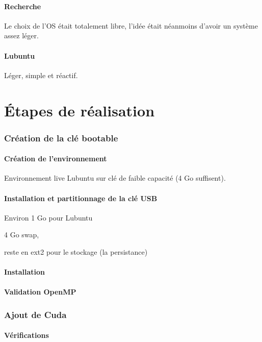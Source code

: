 \documentclass[final]{polytech/polytech}
\begin{document}
\subsection{Recherche}
Le choix de l’OS était totalement libre, l’idée était néanmoins d’avoir un système assez léger.

\subsection{Lubuntu}
Léger, simple et réactif.

\part{Étapes de réalisation}

\section{Création de la clé bootable}

\subsection{Création de l'environnement}
Environnement live Lubuntu sur clé de faible capacité (4 Go suffisent).

\subsection{Installation et partitionnage de la clé USB}
Environ 1 Go pour Lubuntu

4 Go swap, 

reste en ext2 pour le stockage (la persistance)

\subsection{Installation}

\subsection{Validation OpenMP}

\section{Ajout de Cuda}

\subsection{Vérifications}
\end{document}
